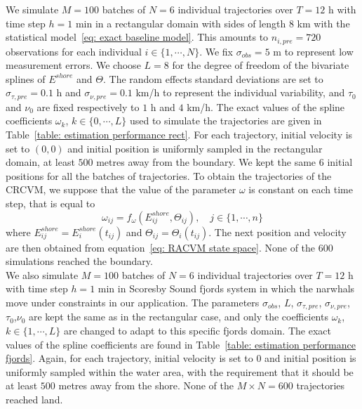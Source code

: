 \documentclass[11pt]{article}
\newcommand {\1}{\mathbb{1}}
\begin{document}
We simulate $M=100$ batches of $N=6$ individual trajectories over $T=12$ h with time step $h=1$ min in a rectangular domain with sides of length $8$ km with the statistical model~\ref{eq: exact baseline model}. This amounts to $n_{i,pre}=720$ observations for each individual $i \in \{1,\cdots,N\}$. We fix $\sigma_{obs}=5$ m to represent low measurement errors. 
We choose $L=8$ for the degree of freedom of the bivariate splines of $E^{shore}$ and $\Theta$. The random effects standard deviations are set to $\sigma_{\tau,pre}=0.1$ h and $\sigma_{\nu,pre}=0.1$ km/h to represent the individual variability, and $\tau_{0}$ and $\nu_{0}$ are fixed respectively to $1$ h and $4$ km/h. The exact values of the spline coefficients $\omega_k$, $k \in \{0,\cdots,L\}$ used to simulate the trajectories are given in Table~\ref{table: estimation performance rect}. For each trajectory, initial velocity is set to $(0,0)$ and initial position is uniformly sampled in the rectangular domain, at least $500$ metres away from the boundary. We kept the same $6$ initial positions for all the batches of trajectories. To obtain the trajectories of the CRCVM, we suppose that the value of the parameter $\omega$ is constant on each time step, that is equal to 
\begin{equation}
	\omega_{ij}=f_{\omega}(E^{shore}_{ij},\Theta_{ij}), \quad j  \in \{1,\cdots,n\}
\end{equation}
where $E^{shore}_{ij}=E^{shore}_i(t_{ij})$ and $\Theta_{ij}=\Theta_i(t_{ij})$. The next position and velocity are then obtained from equation~\ref{eq: RACVM state space}. None of the $600$ simulations reached the boundary. \\


We also simulate $M=100$ batches of $N=6$ individual trajectories over $T=12$ h with time step $h=1$ min in Scoresby Sound fjords system in which the narwhals move under constraints in our application. The parameters $\sigma_{obs}$, $L$, $\sigma_{\tau,pre}$, $\sigma_{\nu,pre}$, $\tau_{0}$,$\nu_{0}$ are kept the same as in the rectangular case, and only the coefficients $\omega_k$, $k \in \{1,\cdots,L\}$ are changed to adapt to this specific fjords domain. The exact values of the spline coefficients are found in Table~\ref{table: estimation performance fjords}.
Again, for each trajectory, initial velocity is set to $0$ and initial position is uniformly sampled within the water area, with the requirement that it should be at least $500$ metres away from the shore.  None of the $M\times N=600$ trajectories reached land.\\
\end{document}

